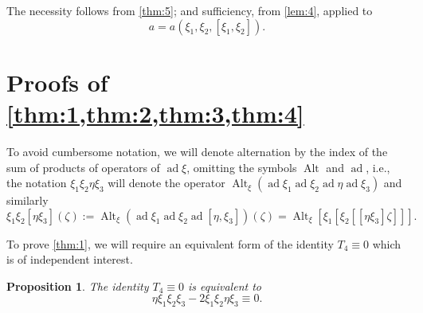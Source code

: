 \documentclass[a4paper]{article}
\newtheorem{proposition}{Proposition}
\newcommand{\ad}{\operatorname{ad}}
\newcommand{\Alt}{\operatorname{Alt}}
\begin{document}
The necessity follows from \cref{thm:5}; and sufficiency, from \cref{lem:4}, applied to 
\begin{equation*}
	a = a(\xi_1,\xi_2,[\xi_1,\xi_2]).
\end{equation*}

\section{Proofs of \texorpdfstring{\cref{thm:1,thm:2,thm:3,thm:4}}{Theorems 1 to 4}}
\label{sec:3}

To avoid cumbersome notation, we will denote alternation by the index of the sum of products of operators of $\ad \xi$, omitting the symbols $\Alt$ and $\ad$, i.e., the notation $\xi_{1}\xi_{2}\eta \xi_{3}$ will denote the operator $\Alt_\xi(\ad \xi_{1} \ad \xi_{2} \ad \eta \ad \xi_{3})$ and similarly
\begin{equation*}
	\xi_{1}\xi_{2}[\eta \xi_{3}](\zeta) := \Alt_\xi(\ad \xi_{1} \ad \xi_{2} \ad [\eta, \xi_{3}])(\zeta) = \Alt_\xi[\xi_{1}[\xi_{2}[[\eta \xi_{3}]\zeta]]].
\end{equation*}

To prove \cref{thm:1}, we will require an equivalent form of the identity $T_4 \equiv 0$ which is of independent interest.

\begin{proposition}
	The identity $T_4 \equiv 0$ is equivalent to
	\begin{equation}
		\label{eq:9}
		\eta \xi_1 \xi_2 \xi_3-2 \xi_1 \xi_2 \eta \xi_3 \equiv 0.
	\end{equation}
\end{proposition} 
\end{document}
